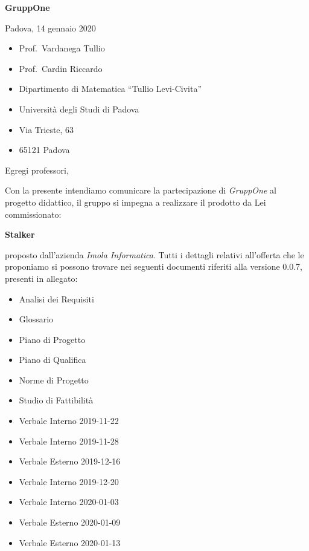 \documentclass{article}
\begin{document}
\begin{center}
  {\LARGE \textbf{GruppOne}}
\end{center}

\begin{multicols}{2}
  Padova, 14 gennaio 2020
  \columnbreak{}
  \begin{itemize}
    \setlength{\itemsep}{0mm}
    \setlength{\parskip}{0mm}
    \renewcommand{\labelitemi}{}
    \item Prof.\ Vardanega Tullio
    \item Prof.\ Cardin Riccardo
    \item Dipartimento di Matematica ``Tullio Levi-Civita''
    \item Università degli Studi di Padova
    \item Via Trieste, 63
    \item 65121 Padova
  \end{itemize}
\end{multicols}
Egregi professori,

Con la presente intendiamo comunicare la partecipazione di \textit{GruppOne} al progetto didattico, il gruppo si impegna a realizzare il prodotto da Lei commissionato:
\begin{center}
  \textbf{Stalker} 
\end{center}
proposto dall'azienda \textit{Imola Informatica}.
Tutti i dettagli relativi all'offerta che le proponiamo si possono trovare nei seguenti documenti riferiti alla versione 0.0.7, presenti in allegato:
\begin{itemize}
  \item Analisi dei Requisiti
  \item Glossario
  \item Piano di Progetto
  \item Piano di Qualifica
  \item Norme di Progetto
  \item Studio di Fattibilità
  \item Verbale Interno 2019-11-22
  \item Verbale Interno 2019-11-28
  \item Verbale Esterno 2019-12-16
  \item Verbale Interno 2019-12-20
  \item Verbale Interno 2020-01-03
  \item Verbale Esterno 2020-01-09
  \item Verbale Esterno 2020-01-13
\end{itemize}
\end{document}
